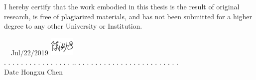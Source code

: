 I hereby certify that the work embodied in this thesis is the result of original research, is free of plagiarized materials, and has not been submitted for a higher degree to any other University or Institution.

\vspace{150pt}


 \ \    
Jul/22/2019  \qquad \qquad \qquad \qquad\qquad\qquad \qquad \qquad \qquad \qquad
\includegraphics[width=0.09\textwidth]{res/sig_en.pdf}
\\
. . . . . . . . . . . . . . . . .\qquad \qquad \qquad \qquad\qquad \qquad . . . .  . . . . . . . . . . . . . . . . . . . . .\\
\indent \qquad Date \qquad \qquad \qquad  \qquad \qquad \qquad\qquad\qquad\qquad\qquad Hongxu Chen
